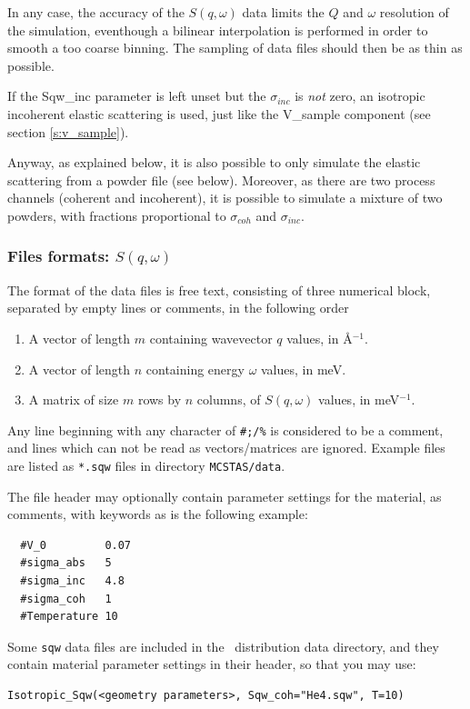 In any case, the accuracy of the $S(q, \omega)$ data limits the $Q$ and $\omega$ resolution of the simulation, eventhough a bilinear interpolation is performed in order to smooth a too coarse binning. The sampling of data files should then be as thin as possible.

If the Sqw\_inc parameter is left unset but the $\sigma_{inc}$ is \emph{not} zero, an isotropic incoherent elastic scattering is used, just like the V\_sample component (see section \ref{s:v_sample}).

Anyway, as explained below, it is also possible to only simulate the elastic scattering from a powder file (see below). Moreover, as there are two process channels (coherent and incoherent), it is possible to simulate a mixture of two powders, with fractions proportional to $\sigma_{coh}$ and $\sigma_{inc}$.

\subsubsection{Files formats: $S(q,\omega)$}

The format of the data files is free text, consisting of three numerical block, separated by empty lines or comments, in the following order
\begin{enumerate}
\item A vector of length $m$ containing wavevector $q$ values, in \AA$^{-1}$.
\item A vector of length $n$ containing energy $\omega$ values, in meV.
\item A matrix of size $m$ rows by $n$ columns, of $S(q, \omega)$ values, in meV$^{-1}$.
\end{enumerate}
Any line beginning with any character of \verb+#;/%+ is considered to be a comment, and lines which can not be read as vectors/matrices are ignored.
Example files are listed as \verb+*.sqw+ files in directory \verb+MCSTAS/data+.

The file header may optionally contain parameter settings for the material, as comments, with keywords as is the following example:
\begin{verbatim}
  #V_0         0.07
  #sigma_abs   5
  #sigma_inc   4.8
  #sigma_coh   1
  #Temperature 10
\end{verbatim}
Some \verb+sqw+ data files are included in the \MCS\ distribution data directory, and they contain material parameter settings in their header, so that you may use:
\begin{verbatim}
Isotropic_Sqw(<geometry parameters>, Sqw_coh="He4.sqw", T=10)
\end{verbatim}

